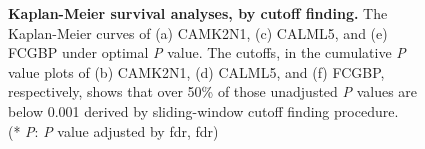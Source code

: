\documentclass[jpm,article,submit,moreauthors,pdftex]{Definitions/mdpi}
\newcommand{\bcaption}[2]{\caption{\textbf{#1} #2}}
\begin{document}
\begin{figure}[hbt!]
\begin{picture}
\end{picture}%

\bcaption{Kaplan-Meier survival analyses, by cutoff finding.}
{The Kaplan-Meier curves of (a) CAMK2N1, (c) CALML5, and (e) FCGBP under optimal \textit{P} value. 
The cutoffs, in the cumulative \textit{P} value plots of (b) CAMK2N1, (d) CALML5, and (f) FCGBP, respectively,
shows that over 50\% of those unadjusted \textit{P} values are below 0.001 derived by sliding-window cutoff finding procedure.\\
(* \textit{P}: \textit{P} value adjusted by \acrlong{fdr}, \acrshort{fdr})
}
\label{fig:figure4}
\end{figure}





\end{document}
